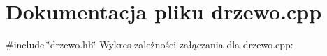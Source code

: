 \section{\-Dokumentacja pliku drzewo.\-cpp}
\label{drzewo_8cpp}
{\ttfamily \#include \char`\"{}drzewo.\-hh\char`\"{}}\*
\-Wykres zależności załączania dla drzewo.\-cpp\-:
